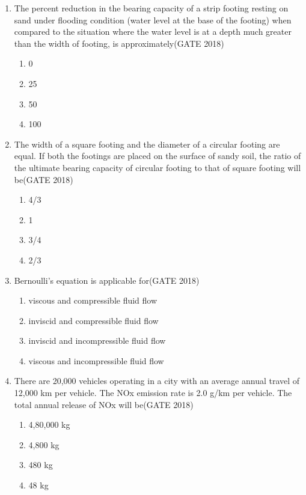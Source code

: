 \documentclass[journal,12pt,onecolumn]{IEEEtran}
\theoremstyle{remark}
\begin{document}
\begin{enumerate}
\item The percent reduction in the bearing capacity of a strip footing resting on sand under flooding condition (water level at the base of the footing) when compared to the situation where the water level is at a depth much greater than the width of footing, is approximately\hfill{(GATE 2018)}
\begin{multicols}{4}
\begin{enumerate}
    \item 0
    \item 25
    \item 50
    \item 100
\end{enumerate}
\end{multicols}
\vspace{1cm}

\item The width of a square footing and the diameter of a circular footing are equal. If both the footings are placed on the surface of sandy soil, the ratio of the ultimate bearing capacity of circular footing to that of square footing will be\hfill{(GATE 2018)}
\begin{multicols}{4}
\begin{enumerate}
    \item 4/3
    \item 1
    \item 3/4
    \item 2/3
\end{enumerate}
\end{multicols}
\vspace{1cm}
\newpage
\item Bernoulli's equation is applicable for\hfill{(GATE 2018)}

\begin{enumerate}
    \item viscous and compressible fluid flow
    \item inviscid and compressible fluid flow
    \item inviscid and incompressible fluid flow
    \item viscous and incompressible fluid flow
\end{enumerate}

\vspace{1cm}

\item There are 20,000 vehicles operating in a city with an average annual travel of 12,000 km per vehicle. The NOx emission rate is 2.0 g/km per vehicle. The total annual release of NOx will be\hfill{(GATE 2018)}
\begin{multicols}{4}
\begin{enumerate}
    \item 4,80,000 kg
    \item 4,800 kg
    \item 480 kg
    \item 48 kg
\end{enumerate}
\end{multicols}
\vspace{1cm}


\end{enumerate}
\end{document}
